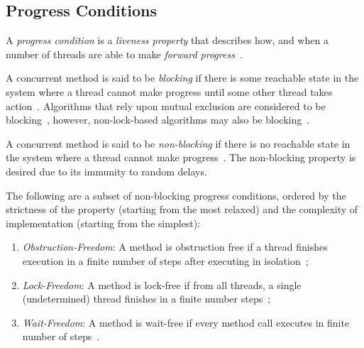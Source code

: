 
\subsection{Progress Conditions}
A \emph{progress condition} is a \emph{liveness property} that describes how,
and when a number of threads are able to make \emph{forward
progress}~\citep[Section~3.2]{scott2013shared}.

A concurrent method is said to be \emph{blocking} if there is some reachable
state in the system where a thread cannot make progress until some other thread
takes action~\citep[Section~3.2]{scott2013shared}. Algorithms that rely upon
mutual exclusion are considered to be
blocking~\citep[Section~3.2]{scott2013shared}, however, non-lock-based
algorithms may also be blocking~\citep{mellor1987concurrent}.

A concurrent method is said to be \emph{non-blocking} if there is no reachable
state in the system where a thread cannot make
progress~\cite[Section~3.2]{scott2013shared}. The non-blocking property is
desired due to its immunity to random delays. %

The following are a subset of non-blocking progress conditions, ordered by the
strictness of the property (starting from the most relaxed) and the complexity of
implementation (starting from the simplest):

\begin{enumerate}
\item \emph{Obstruction-Freedom}: A method is obstruction free if a thread
finishes execution in a finite number of steps after executing in isolation~\citep[Section~3.8.3]{herlihy2020art};
\item \emph{Lock-Freedom}: A method is lock-free if from all threads, a single
(undetermined) thread finishes in a finite number steps~\citep[Section~3.8.2]{herlihy2020art};
\item \emph{Wait-Freedom}: A method is wait-free if every method call executes
in finite number of steps~\citep[Section~3.8.1]{herlihy2020art}.
\end{enumerate}

